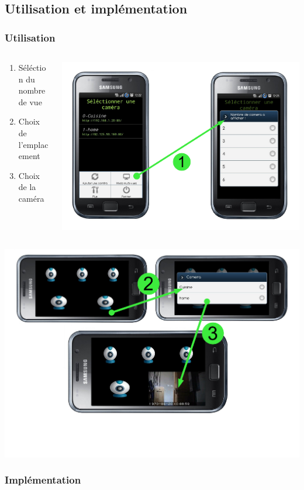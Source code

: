   \subsection{Utilisation et implémentation}
  \begin{frame}
   \frametitle{Utilisation}

\begin{columns}
\begin{column}{7cm}
\begin{enumerate}
    \item Séléction du nombre de vue
  	\item Choix de l'emplacement
  	\item Choix de la caméra
\end{enumerate}
\end{column}
\begin{column}{7cm}
   \includegraphics[scale=0.15]{Images/slide9-2part1.pdf}
\end{column}
\end{columns}
\begin{center}
   \includegraphics[scale=0.25]{Images/slide9-2part2.pdf}
   \end{center}

  \end{frame}
 
  \begin{frame}
   \frametitle{Implémentation}




  \end{frame}
  